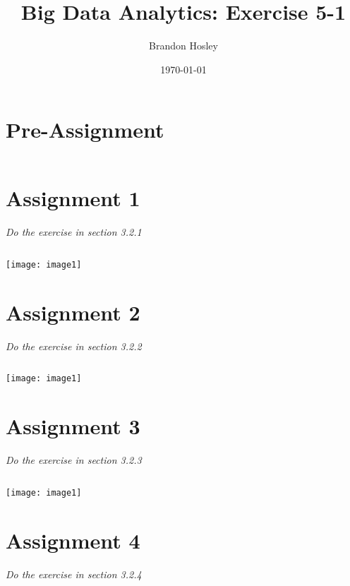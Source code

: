 \documentclass[]{article}
\title{Big Data Analytics: Exercise 5-1}
\author{Brandon Hosley}
\date{\today}
\begin{document}
\maketitle

\section*{Pre-Assignment}
\begin{verbatim}
\end{verbatim}

\section*{Assignment 1}
\emph{ Do the exercise in section 3.2.1 }

\begin{verbatim}

\end{verbatim}
\texttt{[image: image1]} %


\section*{Assignment 2}
\emph{ Do the exercise in section 3.2.2 }

\begin{verbatim}

\end{verbatim}
\texttt{[image: image1]} %


\section*{Assignment 3}
\emph{ Do the exercise in section 3.2.3 }

\begin{verbatim}

\end{verbatim}
\texttt{[image: image1]} %


\section*{Assignment 4}
\emph{ Do the exercise in section 3.2.4 }
\end{document}
